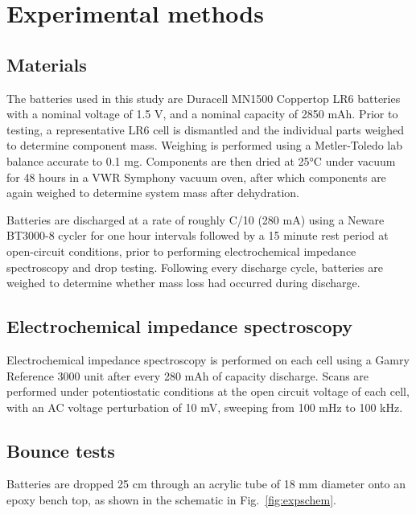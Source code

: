\section{Experimental methods}
\label{sec:dbb:exp}

\subsection{Materials}

The batteries used in this study are Duracell MN1500 Coppertop LR6 batteries with a nominal voltage of 1.5 V, and a nominal capacity of 2850 mAh. Prior to testing, a representative LR6 cell is dismantled and the individual parts weighed to determine component mass. Weighing is performed using a Metler-Toledo lab balance accurate to 0.1 mg. Components are then dried at 25°C under vacuum for 48 hours in a VWR Symphony vacuum oven, after which components are again weighed to determine system mass after dehydration.

Batteries are discharged at a rate of roughly C/10 (280 mA) using a Neware BT3000-8 cycler for one hour intervals followed by a 15 minute rest period at open-circuit conditions, prior to performing electrochemical impedance spectroscopy and drop testing. Following every discharge cycle, batteries are weighed to determine whether mass loss had occurred during discharge.


\subsection{Electrochemical impedance spectroscopy}

Electrochemical impedance spectroscopy is performed on each cell using a Gamry Reference 3000 unit after every 280 mAh of capacity discharge. Scans are performed under potentiostatic conditions at the open circuit voltage of each cell, with an AC voltage perturbation of 10 mV, sweeping from 100 mHz to 100 kHz. 



\subsection{Bounce tests}

Batteries are dropped 25 cm through an acrylic tube of 18 mm diameter onto an epoxy bench top, as shown in the schematic in Fig.~\ref{fig:expschem}. 

